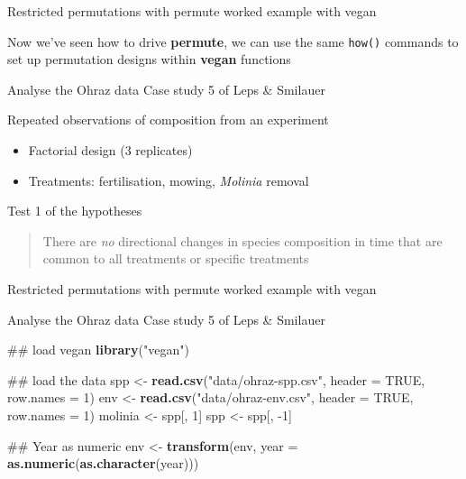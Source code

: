 \documentclass[10pt,ignorenonframetext,compress, aspectratio=169]{beamer}
\newenvironment{Shaded}{\begin{snugshade}}{\end{snugshade}}
\newcommand{\KeywordTok}[1]{\textcolor[rgb]{0.13,0.29,0.53}{\textbf{{#1}}}}
\newcommand{\DataTypeTok}[1]{\textcolor[rgb]{0.13,0.29,0.53}{{#1}}}
\newcommand{\DecValTok}[1]{\textcolor[rgb]{0.00,0.00,0.81}{{#1}}}
\newcommand{\StringTok}[1]{\textcolor[rgb]{0.31,0.60,0.02}{{#1}}}
\newcommand{\OtherTok}[1]{\textcolor[rgb]{0.56,0.35,0.01}{{#1}}}
\newcommand{\NormalTok}[1]{{#1}}
\begin{document}
\begin{frame}{Restricted permutations with permute \textbar{} worked
example with vegan}

Now we've seen how to drive \textbf{permute}, we can use the same
\texttt{how()} commands to set up permutation designs within
\textbf{vegan} functions

Analyse the Ohraz data Case study 5 of Leps \& Smilauer

Repeated observations of composition from an experiment

\begin{itemize}
\itemsep1pt\parskip0pt
\item
  Factorial design (3 replicates)
\item
  Treatments: fertilisation, mowing, \emph{Molinia} removal
\end{itemize}

Test 1 of the hypotheses

\begin{quote}
There are \emph{no} directional changes in species composition in time
that are common to all treatments or specific treatments
\end{quote}

\end{frame}

\begin{frame}[fragile]{Restricted permutations with permute \textbar{}
worked example with vegan}

Analyse the Ohraz data Case study 5 of Leps \& Smilauer

\scriptsize

\begin{Shaded}
\begin{Highlighting}[]
\NormalTok{## load vegan}
\KeywordTok{library}\NormalTok{(}\StringTok{"vegan"}\NormalTok{)}

\NormalTok{## load the data}
\NormalTok{spp <-}\StringTok{ }\KeywordTok{read.csv}\NormalTok{(}\StringTok{"data/ohraz-spp.csv"}\NormalTok{, }\DataTypeTok{header =} \OtherTok{TRUE}\NormalTok{, }\DataTypeTok{row.names =} \DecValTok{1}\NormalTok{)}
\NormalTok{env <-}\StringTok{ }\KeywordTok{read.csv}\NormalTok{(}\StringTok{"data/ohraz-env.csv"}\NormalTok{, }\DataTypeTok{header =} \OtherTok{TRUE}\NormalTok{, }\DataTypeTok{row.names =} \DecValTok{1}\NormalTok{)}
\NormalTok{molinia <-}\StringTok{ }\NormalTok{spp[, }\DecValTok{1}\NormalTok{]}
\NormalTok{spp <-}\StringTok{ }\NormalTok{spp[, -}\DecValTok{1}\NormalTok{]}

\NormalTok{## Year as numeric}
\NormalTok{env <-}\StringTok{ }\KeywordTok{transform}\NormalTok{(env, }\DataTypeTok{year =} \KeywordTok{as.numeric}\NormalTok{(}\KeywordTok{as.character}\NormalTok{(year)))}
\end{Highlighting}
\end{Shaded}

\normalsize

\end{frame}
\end{document}
